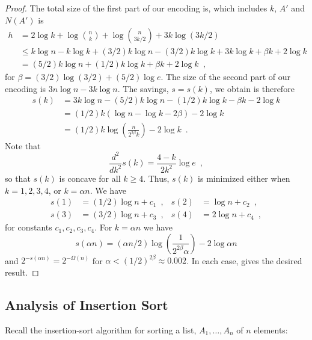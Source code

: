 \documentclass{patmorin}
\begin{document}
\begin{proof}
  The total size of the first part of our encoding is, which includes
  $k$, $A'$ and $N(A')$ is
  \begin{align*}
    h & = 2\log k + \log\binom{n}{k} + \log\binom{n}{3k/2} + 3k\log (3k/2) \\
      & \le k\log n - k\log k + (3/2)k\log n - (3/2)k\log k + 3k\log k + \beta k + 2 \log k \\
      & = (5/2)k\log n + (1/2)k\log k + \beta k + 2 \log k  \enspace ,
  \end{align*}
  for $\beta = (3/2) \log (3/2) + (5/2) \log e$. The size of the
  second part of our encoding is $3n\log n - 3k\log n$.  The savings,
  $s=s(k)$, we obtain is therefore
  \begin{align*}
    s(k) & = 3k\log n - (5/2)k\log n - (1/2)k\log k - \beta k - 2 \log k \\
         & = (1/2)k(\log n - \log k - 2 \beta) - 2\log k \\
         & = (1/2)k\log\left(\frac{n}{2^{2\beta} k}\right) - 2 \log k \enspace .
  \end{align*}
  Note that
  \[
  \frac{d^2}{dk^2} s(k) = \frac{4 - k}{2 k^2} \log e \enspace ,
  \]
  so that $s(k)$ is concave for all $k \geq 4$. Thus, $s(k)$ is
  minimized either when $k = 1, 2, 3, 4$, or $k = \alpha n$. We have
  \begin{align*}
    s(1) &= (1/2)\log n + c_1 \enspace , & 
    s(2) &= \log n + c_2 \enspace , \\
    s(3) &= (3/2) \log n + c_3 \enspace , &
    s(4) &= 2 \log n + c_4 \enspace ,
  \end{align*}
  for constants $c_1, c_2, c_3, c_4$. For $k=\alpha n$ we have
  \[
  s(\alpha n) = (\alpha n/2)\log \left(\frac{1}{2^{2\beta} \alpha}\right)
  - 2 \log \alpha n
  \]
  and $2^{-s(\alpha n)} = 2^{-\Omega(n)}$ for
  $\alpha < (1/2)^{2\beta} \approx 0.002$. In each case,  gives the
  desired result.
\end{proof}

\subsection{Analysis of Insertion Sort}

Recall the insertion-sort algorithm for sorting a list, $A_1,\ldots,A_n$
of $n$ elements:

\begin{algorithmic}[1]
     \ENDWHILE
  \ENDFOR
\end{algorithmic}
\end{document}
